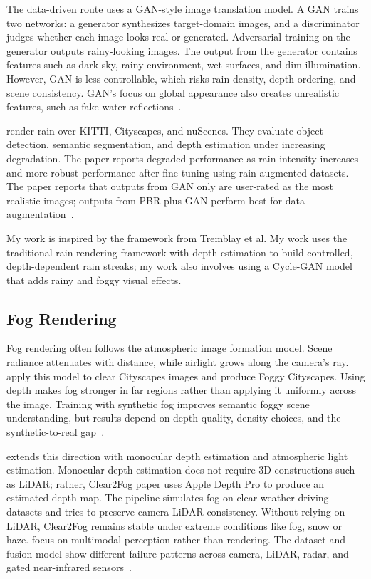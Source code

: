 \documentclass[10pt,letterpaper]{article}
\begin{document}
The data-driven route uses a GAN-style image translation model. A GAN trains two networks: a
generator synthesizes target-domain images, and a discriminator judges whether each image looks
real or generated. Adversarial training on the generator outputs rainy-looking images. The
output from the generator contains features such as dark sky, rainy environment, wet surfaces,
and dim illumination. However, GAN is less controllable, which risks rain density, depth
ordering, and scene consistency. GAN's focus on global appearance also creates unrealistic
features, such as fake water
reflections~\cite{tremblayRainRenderingEvaluating2021,
isolaImagetoImageTranslationConditional2018,huangMultimodalUnsupervisedImagetoImage2018}.


\textcite{tremblayRainRenderingEvaluating2021} render rain over KITTI, Cityscapes, and nuScenes. They evaluate object
detection, semantic segmentation, and depth estimation under increasing degradation. The paper
reports degraded performance as rain intensity increases and more robust performance after
fine-tuning using rain-augmented datasets. The paper reports that outputs from GAN only are
user-rated as the most realistic images; outputs from PBR plus GAN perform best for data
augmentation~\cite{tremblayRainRenderingEvaluating2021}.


My work is inspired by the framework from Tremblay et al. My work uses the traditional rain
rendering framework with depth estimation to build controlled,
depth-dependent rain streaks; my work also involves using a Cycle-GAN model that adds rainy
and foggy visual effects.


\subsection{Fog Rendering}

Fog rendering often follows the atmospheric image formation model. Scene radiance attenuates
with distance, while airlight grows along the camera's ray. \textcite{sakaridisSemanticFoggyScene2018} apply
this model to clear Cityscapes images and produce Foggy Cityscapes. Using depth makes fog stronger
in far regions rather than applying it uniformly across the image. Training with synthetic fog improves
semantic foggy scene understanding, but results depend on depth quality, density choices, and
the synthetic-to-real gap~\cite{sakaridisSemanticFoggyScene2018}.

\textcite{mohamedDataEfficiencyStudy2026} extends this direction with monocular depth estimation and atmospheric light
estimation. Monocular depth estimation does not require 3D constructions such as LiDAR; rather,
Clear2Fog paper uses Apple Depth Pro to produce an estimated depth map. The pipeline simulates fog
on clear-weather driving datasets and tries to preserve camera-LiDAR consistency. Without
relying on LiDAR, Clear2Fog remains stable under extreme conditions like fog, snow or haze.
\textcite{bijelicSeeingFogSeeing2020} focus on multimodal perception rather than rendering.
The dataset and fusion model show different failure patterns across camera, LiDAR, radar, and
gated near-infrared
sensors~\cite{mohamedDataEfficiencyStudy2026,bijelicSeeingFogSeeing2020}.
\end{document}

